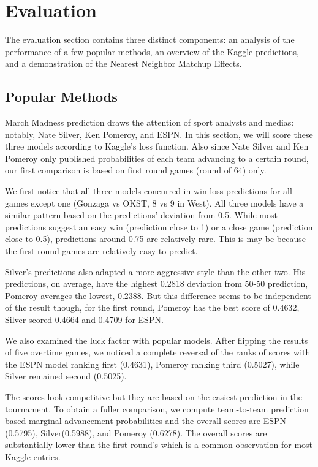 \section{Evaluation}
The evaluation section contains three distinct components: an analysis of the performance of a few popular methods, an overview of the Kaggle predictions, and a demonstration of the Nearest Neighbor Matchup Effects.
\subsection{Popular Methods}
March Madness prediction draws the attention of sport analysts and medias: notably, Nate Silver, Ken Pomeroy, and ESPN. In this section, we will score these three models according to Kaggle's loss function. Also since Nate Silver and Ken Pomeroy only published probabilities of each team advancing to a certain round, our first comparison is based on first round games (round of 64) only. 
  
We first notice that all three models concurred in win-loss predictions for all games  except one (Gonzaga vs OKST, 8 vs 9 in West). All three models have a similar pattern based on the predictions' deviation from 0.5. While most predictions suggest an easy win (prediction close to 1) or a close game (prediction close to 0.5), predictions around 0.75 are relatively rare. This is may be because the first round games are relatively easy to predict.

Silver's predictions also adapted a more aggressive style than the other two. His predictions, on average, have the highest 0.2818  deviation from 50-50 prediction, Pomeroy averages the lowest, 0.2388. But this difference seems to be independent of the result though, for the first round, Pomeroy has the best score of 0.4632, Silver scored 0.4664 and 0.4709 for ESPN. 

We also examined the luck factor with popular models. After flipping the results of five overtime games, we noticed a complete reversal of the ranks of scores with the ESPN model ranking first (0.4631), Pomeroy ranking third (0.5027), while Silver remained second (0.5025).

The scores look competitive but they are based on the easiest prediction in the tournament. To obtain a fuller comparison, we compute team-to-team prediction based marginal advancement probabilities and  the overall scores are ESPN (0.5795), Silver(0.5988), and Pomeroy (0.6278). The overall scores are substantially lower than the first round's which is a common observation for most Kaggle entries.    

